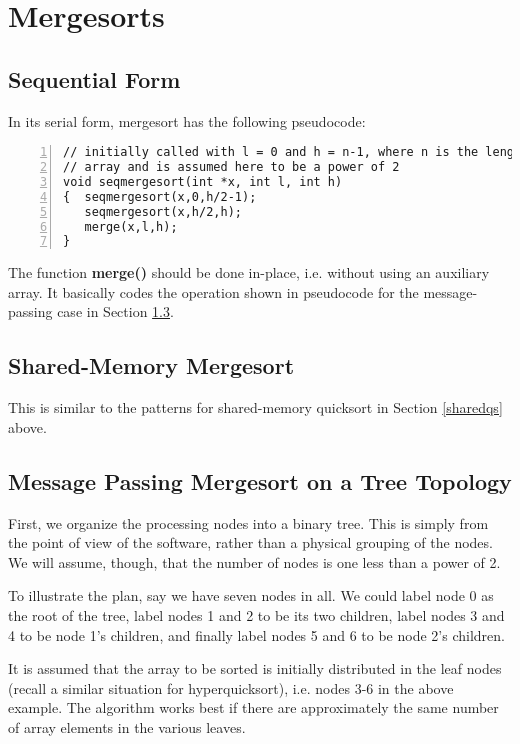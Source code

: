 \section{Mergesorts}
\label{mergesort}

\subsection{Sequential Form}

In its serial form, mergesort has the following pseudocode:

\begin{Verbatim}[fontsize=\relsize{-2},numbers=left]
// initially called with l = 0 and h = n-1, where n is the length of the
// array and is assumed here to be a power of 2
void seqmergesort(int *x, int l, int h)
{  seqmergesort(x,0,h/2-1);
   seqmergesort(x,h/2,h);
   merge(x,l,h);
}
\end{Verbatim}

The function {\bf merge()} should be done in-place, i.e. without using
an auxiliary array.  It basically codes the operation shown in
pseudocode for the message-passing case in Section \ref{basicstuff}.

\subsection{Shared-Memory Mergesort} 

This is similar to the patterns for shared-memory quicksort in Section 
\ref{sharedqs} above.

\subsection{Message Passing Mergesort on a Tree Topology}
\label{basicstuff}

First, we organize the processing nodes into a binary tree. This is
simply from the point of view of the software, rather than a physical
grouping of the nodes.  We will assume, though, that the number of nodes
is one less than a power of 2.

To illustrate the plan, say we have seven nodes in all. We could label
node 0 as the root of the tree, label nodes 1 and 2 to be its two
children, label nodes 3 and 4 to be node 1's children, and finally label
nodes 5 and 6 to be node 2's children.

It is assumed that the array to be sorted is initially distributed in
the leaf nodes (recall a similar situation for hyperquicksort), i.e.
nodes 3-6 in the above example. The algorithm works best if there are
approximately the same number of array elements in the various leaves.


